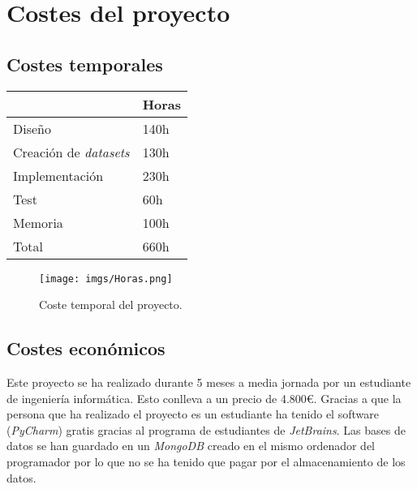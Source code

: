 \documentclass[../all.tex]{subfiles}
\begin{document}
\section{Costes del proyecto} 

\subsection{Costes temporales} 
	\begin{center}
		\begin{tabular}{ | m{3cm} | m{4cm}|  } 
			\hline
			\textbf{ } & \textbf{Horas} \\ 
			\hline
			Diseño & 140h\\ 
			\hline
			Creación de \newline \textit{datasets} & 130h\\ 
			\hline
			Implementación & 230h\\ 
			\hline
			Test & 60h\\ 
			\hline
			Memoria & 100h\\ 
			\hline
			\hline
			Total & 660h\\ 
			\hline
		\end{tabular}
	\end{center}
	\begin{figure}[H]
		\centering
		\texttt{[image: imgs/Horas.png]}
		\caption{Coste temporal del proyecto.}
	\end{figure} 

\subsection{Costes económicos} 
	
	Este proyecto se ha realizado durante 5 meses a media jornada por un estudiante de ingeniería informática. Esto conlleva a un precio de 4.800€. Gracias a que la persona que ha realizado el proyecto es un estudiante ha tenido el software (\textit{PyCharm}) gratis gracias al programa de estudiantes de \textit{JetBrains}. Las bases de datos se han guardado en un \textit{MongoDB} creado en el mismo ordenador del programador por lo que no se ha tenido que pagar por el almacenamiento de los datos.
\end{document}
